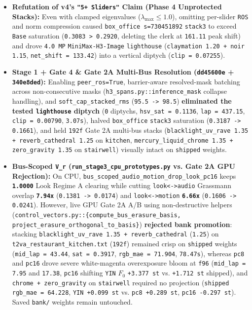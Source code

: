 \documentclass[10pt]{article}
\begin{document}
\begin{itemize}[leftmargin=*]
\item \textbf{Refutation of v4's \texttt{"5+ Sliders"} Claim (Phase 4 Unprotected Stacks):} Even with clamped eigenvalues ($\lambda_{\max} \le 1.0$), omitting per-slider \texttt{ROS} and norm compression caused \texttt{box\_office s=730451892} \texttt{stack3} to exceed \texttt{Base} saturation (\texttt{0.3083 > 0.2920}, deleting the clerk at \texttt{161.11} peak shift) and drove \texttt{4.0 MP} \texttt{MiniMax-H3-Image} \texttt{lighthouse} (\texttt{claymation 1.20 + noir 1.15}, \texttt{net\_shift = 133.42}) into a vertical diptych (\texttt{clip = 0.07255}).
\item \textbf{Stage 1 + Gate 4 \& Gate 2A Multi-Bus Resolution (\texttt{dd45600e} + \texttt{340e8ded}):} Enabling \texttt{peer\_ros=True}, barrier-aware resolved-mask batching across non-consecutive masks (\texttt{h3\_spans.py::inference\_mask} collapse handling), and \texttt{soft\_cap\_stacked\_rms} (\texttt{95.5 -> 98.5}) \textbf{eliminated the tested \texttt{lighthouse} diptych} (\texttt{0} diptychs, \texttt{hsv\_sat = 0.1136}, \texttt{lap = 437.15}, \texttt{clip = 0.00790}, \texttt{3.07s}), halved \texttt{box\_office} \texttt{stack3} saturation (\texttt{0.3187 -> 0.1661}), and held \texttt{192f} Gate 2A multi-bus stacks (\texttt{blacklight\_uv\_rave 1.35 + reverb\_cathedral 1.25} on \texttt{kitchen}, \texttt{mercury\_liquid\_chrome 1.35 + zero\_gravity 1.35} on \texttt{stairwell}) visually intact on \texttt{shipped} weights.
\item \textbf{Bus-Scoped \texttt{V\_r} (\texttt{run\_stage3\_cpu\_prototypes.py} vs. Gate 2A GPU Rejection):} On CPU, \texttt{bus\_scoped\_audio\_motion\_drop\_look\_pc16} keeps \textbf{\texttt{1.0000}} Look Regime A clearing while cutting \texttt{look<->audio} Grassmann overlap \textbf{\texttt{7.94x}} (\texttt{0.1381 -> 0.0174}) and \texttt{look<->motion} \textbf{\texttt{6.66x}} (\texttt{0.1606 -> 0.0241}). However, live GPU Gate 2A A/B using non-destructive helpers (\texttt{control\_vectors.py::\{compute\_bus\_erasure\_basis, project\_erasure\_orthogonal\_to\_basis\}}) \textbf{rejected bank promotion}: stacking \texttt{blacklight\_uv\_rave 1.35 + reverb\_cathedral} (\texttt{1.25}) on \texttt{t2va\_restaurant\_kitchen.txt} (\texttt{192f}) remained crisp on \texttt{shipped} weights (\texttt{mid\_lap = 43.44}, \texttt{sat = 0.3917}, \texttt{rgb\_mae = 71.904}, \texttt{78.47s}), whereas \texttt{pc8} and \texttt{pc16} drove severe white-magenta overexposure bloom at \texttt{f96} (\texttt{mid\_lap = 7.95} and \texttt{17.38}, \texttt{pc16} shifting \texttt{YIN} $F_0$ \texttt{+3.377 st} vs. \texttt{+1.712 st} shipped), and \texttt{chrome + zero\_gravity} on \texttt{stairwell} required no projection (\texttt{shipped} \texttt{rgb\_mae = 64.228}, \texttt{YIN +0.099 st} vs. \texttt{pc8 +0.289 st}, \texttt{pc16 -0.297 st}). Saved \texttt{bank/} weights remain untouched.
\end{itemize}
\end{document}
